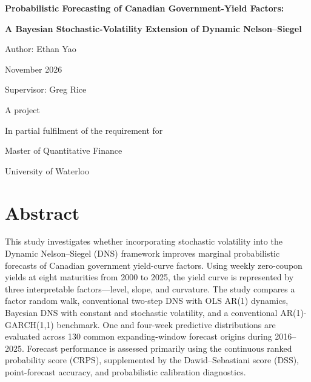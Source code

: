 \documentclass[
  12pt,
  letterpaper,
  DIV=11,
  numbers=noendperiod]{scrreprt}
\author{}
\date{}
\renewcommand{\listoffigures}{}
\renewcommand{\listoftables}{}
\begin{document}
\listoffigures
\listoftables

\begin{titlepage}
\centering
\vspace*{1cm}
{\Large\bfseries Probabilistic Forecasting of Canadian Government-Yield Factors:\par}
\vspace{0.4cm}
{\Large\bfseries A Bayesian Stochastic-Volatility Extension of Dynamic Nelson--Siegel\par}
\vspace{1.6cm}
{\large Author: Ethan Yao\par}
\vspace{0.7cm}
November 2026\par
\vspace{0.7cm}
Supervisor: Greg Rice\par
\vfill
A project\par
In partial fulfilment of the requirement for\par
Master of Quantitative Finance\par
University of Waterloo\par

\end{titlepage}
\chapter*{Abstract}

This study investigates whether incorporating stochastic volatility into
the Dynamic Nelson--Siegel (DNS) framework improves marginal
probabilistic forecasts of Canadian government yield-curve factors.
Using weekly zero-coupon yields at eight maturities from 2000 to 2025,
the yield curve is represented by three interpretable factors---level,
slope, and curvature. The study compares a factor random walk,
conventional two-step DNS with OLS AR(1) dynamics, Bayesian DNS with
constant and stochastic volatility, and a conventional AR(1)-GARCH(1,1)
benchmark. One and four-week predictive distributions are evaluated
across 130 common expanding-window forecast origins during 2016--2025.
Forecast performance is assessed primarily using the continuous ranked
probability score (CRPS), supplemented by the Dawid--Sebastiani score
(DSS), point-forecast accuracy, and probabilistic calibration
diagnostics.
\end{document}
